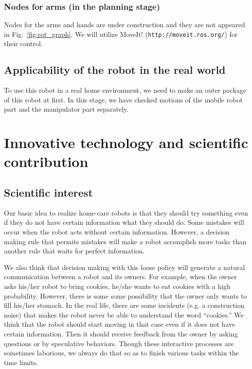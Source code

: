 \documentclass{llncs}
\begin{document}
\subsubsection{Nodes for arms (in the planning stage)}
Nodes for the arms and hands are under construction and
they are not appeared in Fig.~\ref{fig:rqt_graph}.
We will utilize MoveIt! (\texttt{http://moveit.ros.org/})
for their control.

\subsection{Applicability of the robot in the real world}

To use this robot in a real home environment,
we need to make an outer package of this robot at first.
In this stage, we have checked motions of the mobile robot part
and the manipulator part separately.


\section{Innovative technology and scientific contribution}\label{sec:contribution}

\subsection{Scientific interest}

Our basic idea to realize home-care robots is that they
should try something even if they do not have certain information
what they should do. Some mistakes will occur when the robot
acts without certain information.
However, a decision making rule that permits mistakes will make
a robot accomplish more tasks than another rule that waits for
perfect information.

We also think that decision making with this loose policy
will generate a natural communication between a robot and its owners.
For example, when the owner asks his/her robot to bring cookies,
he/she wants to eat cookies with a high probability.
However, there is some some possibility that the owner
only wants to fill his/her stomach.
In the real life, there are some incidents
(e.g. a construction noise) that
makes the robot never be able to understand the word ``cookies.''
We think that the robot should start moving in that case
even if it does not have certain information.
Then it should receive feedback from the owner
by asking questions or by speculative behaviors.
Though these interactive processes are sometimes laborious,
we always do that so as to finish various tasks within
the time limits.
\end{document}
